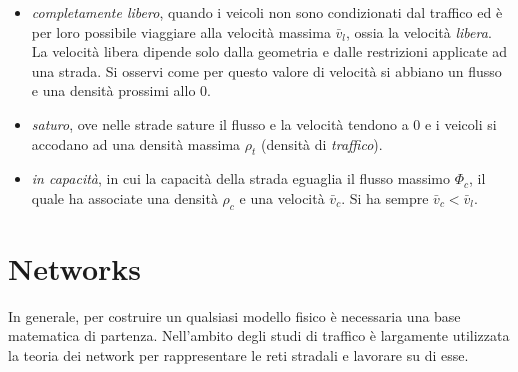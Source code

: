 \documentclass[../main.tex]{subfiles}
\begin{document}
\begin{itemize}
    \item \emph{completamente libero}, quando i veicoli non sono condizionati dal traffico ed \`e per loro possibile viaggiare alla velocit\`a massima $\bar{v}_l$, ossia la velocit\`a \emph{libera}.
        La velocit\`a libera dipende solo dalla geometria e dalle restrizioni applicate ad una strada.
        Si osservi come per questo valore di velocit\`a si abbiano un flusso e una densit\`a prossimi allo $0$.
    \item \emph{saturo}, ove nelle strade sature il flusso e la velocit\`a tendono a $0$ e i veicoli si accodano ad una densit\`a massima $\rho_t$ (densit\`a di \emph{traffico}).
    \item \emph{in capacit\`a}, in cui la capacit\`a della strada eguaglia il flusso massimo $\Phi_c$, il quale ha associate una densit\`a $\rho_c$ e una velocit\`a $\bar{v}_c$.
        Si ha sempre $\bar{v}_c<\bar{v}_l$.
\end{itemize}

\section{Networks}
In generale, per costruire un qualsiasi modello fisico \`e necessaria una base matematica di partenza.
Nell'ambito degli studi di traffico \`e largamente utilizzata la teoria dei network per rappresentare le reti stradali e lavorare su di esse.
\end{document}
